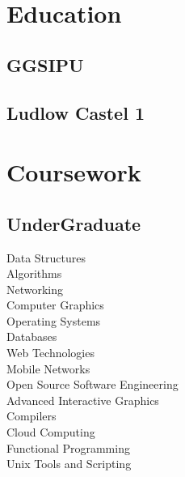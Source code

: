 \documentclass[]{deedy-resume-openfont}
\begin{document}
%
%
\lastupdated

%
%



%
%

\begin{minipage}[t]{0.33\textwidth} 


\section{Education} 

\subsection{GGSIPU}
\sectionsep

\subsection{Ludlow Castel 1}
\sectionsep


\section{Coursework}
\subsection{UnderGraduate}
Data Structures \\
Algorithms \\
Networking \\
Computer Graphics \\
Operating Systems \\
Databases \\
Web Technologies \\
Mobile Networks \\
Open Source Software Engineering \\
Advanced Interactive Graphics \\
Compilers \\
Cloud Computing \\
Functional Programming \\
Unix Tools and Scripting \\
\sectionsep


\end{minipage}
\end{document}
